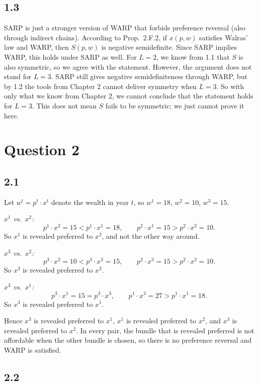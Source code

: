 \documentclass[12pt,letterpaper]{article}
\begin{document}
\subsection*{1.3}

SARP is just a stronger version of WARP that forbids preference reversal (also through indirect chains). According to Prop.~2.F.2, if $x(p,w)$ satisfies Walras' law and WARP, then $S(p,w)$ is negative semidefinite. Since SARP implies WARP, this holds under SARP as well. For $L=2$, we know from 1.1 that $S$ is also symmetric, so we agree with the statement. However, the argument does not stand for $L=3$. SARP still gives negative semidefiniteness through WARP, but by 1.2 the tools from Chapter 2 cannot deliver symmetry when $L=3$. So with only what we know from Chapter 2, we cannot conclude that the statement holds for $L=3$. This does not mean $S$ fails to be symmetric; we just cannot prove it here.

\section*{Question 2}

\subsection*{2.1}

Let $w^t = p^t\cdot x^t$ denote the wealth in year $t$, so $w^1=18$, $w^2=10$, $w^3=15$.

\textit{$x^1$ vs.\ $x^2$:}
\[
p^1\cdot x^2 = 15 < p^1\cdot x^1 = 18, \qquad p^2\cdot x^1 = 15 > p^2\cdot x^2 = 10 .
\]
So $x^1$ is revealed preferred to $x^2$, and not the other way around.

\textit{$x^3$ vs.\ $x^2$:}
\[
p^3\cdot x^2 = 10 < p^3\cdot x^3 = 15, \qquad p^2\cdot x^3 = 15 > p^2\cdot x^2 = 10 .
\]
So $x^3$ is revealed preferred to $x^2$.

\textit{$x^3$ vs.\ $x^1$:}
\[
p^3\cdot x^1 = 15 = p^3\cdot x^3, \qquad p^1\cdot x^3 = 27 > p^1\cdot x^1 = 18 .
\]
So $x^3$ is revealed preferred to $x^1$.

Hence $x^3$ is revealed preferred to $x^1$, $x^1$ is revealed preferred to $x^2$, and $x^3$ is revealed preferred to $x^2$. In every pair, the bundle that is revealed preferred is not affordable when the other bundle is chosen, so there is no preference reversal and WARP is satisfied.

\subsection*{2.2}
\end{document}
